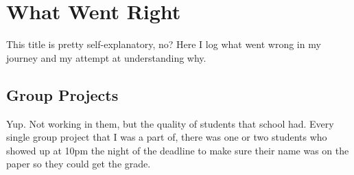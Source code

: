 \chapter{What Went Right}

This title is pretty self-explanatory, no? Here I log what went wrong in my journey
and my attempt at understanding why.

\section{Group Projects}
Yup. Not working in them, but the quality of students that school had. Every single
group project that I was a part of, there was one or two students who showed up at
10pm the night of the deadline to make sure their name was on the paper so they could get
the grade.